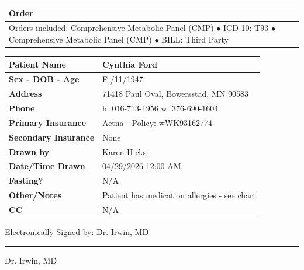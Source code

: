 \documentclass[11pt]{article}
\begin{document}
\vspace{-1pt}


\begin{tabularx}{\textwidth}{|X|}
\hline
\textbf{Order}
\\
\hline

Orders included:
Comprehensive Metabolic Panel (CMP)
$\bullet$
ICD-10:
T93
$\bullet$
Comprehensive Metabolic Panel (CMP)
$\bullet$
BILL:
Third Party

\\
\hline
\end{tabularx}

\vspace{-1pt}


\begin{tabularx}{\textwidth}{|p{2.9in}|X|}
\hline
\textbf{Patient Name}
&
Cynthia Ford
\\
\hline

\textbf{Sex - DOB - Age}
&
F
\quad
05/11/1947
\quad
79
\\
\hline

\textbf{Address}
&
71418 Paul Oval, Bowersstad, MN 90583
\\
\hline

\textbf{Phone}
&
h: 016-713-1956
\quad
w: 376-690-1604
\\
\hline

\textbf{Primary Insurance}
&
Aetna - Policy: wWK93162774
\\
\hline

\textbf{Secondary Insurance}
&
None
\\
\hline

\textbf{Drawn by}
&
Karen Hicks
\\
\hline

\textbf{Date/Time Drawn}
&
04/29/2026 12:00 AM
\\
\hline

\textbf{Fasting?}
&
N/A
\\
\hline

\textbf{Other/Notes}
&
Patient has medication allergies - see chart
\\
\hline

\textbf{CC}
&
N/A
\\
\hline

\end{tabularx}

\vspace{35pt}


\begin{center}

Electronically Signed by:
Dr. Irwin, MD

\vspace{20pt}

\rule{4in}{0.5pt}

\vspace{12pt}

{\Large Dr. Irwin, MD}

\end{center}
\end{document}

